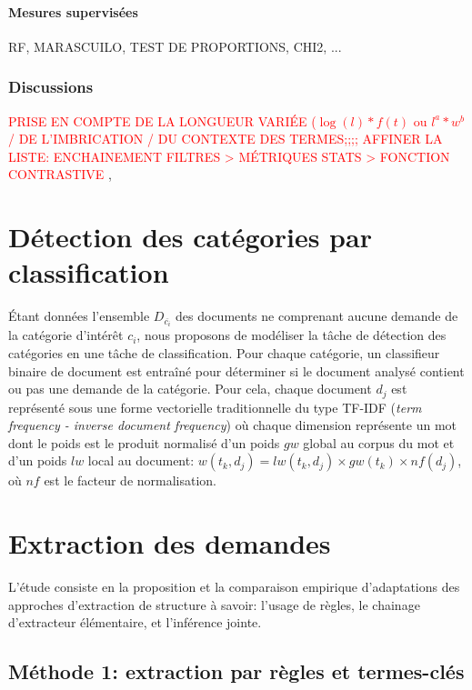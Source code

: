 \paragraph{Mesures supervisées}
RF, MARASCUILO, TEST DE PROPORTIONS, CHI2, ...



\subsubsection{Discussions}
\textcolor{red}{PRISE EN COMPTE DE LA LONGUEUR VARIÉE ($\log(l) * f(t)$ ou $l^a * w^b$ / DE L'IMBRICATION / DU CONTEXTE DES TERMES;;;; AFFINER LA LISTE: ENCHAINEMENT FILTRES > MÉTRIQUES STATS > FONCTION CONTRASTIVE}
\cite{LossioVentura2014biotex}, \cite{Bonin2010multiwordncvalue}


\section{Détection des catégories par classification}

Étant données l'ensemble $D_{\overline{c_i}}$ des documents ne comprenant aucune demande de la catégorie d'intérêt $c_i$, nous proposons de modéliser la tâche de détection des catégories en une tâche de classification. Pour chaque catégorie, un classifieur binaire de document est entraîné pour déterminer si le document analysé contient ou pas une demande de la catégorie. Pour cela, chaque document $d_j$ est représenté sous une forme vectorielle traditionnelle du type TF-IDF (\textit{term frequency - inverse document frequency}) où chaque dimension représente un mot dont le poids est le produit normalisé d'un poids $gw$ global au corpus du mot et d'un poids $lw$ local au document: $w(t_k, d_j) = lw(t_k, d_j) \times gw(t_k) \times nf(d_j)$, où $nf$ est le facteur de normalisation. 


\section{Extraction des demandes}
\label{sec:quanta:attributs}

L'étude consiste en la proposition et la comparaison empirique d'adaptations des approches d'extraction de structure à savoir: l'usage de règles, le chainage d'extracteur élémentaire, et l'inférence jointe.


\subsection{Méthode 1: extraction par règles et termes-clés}
\label{subsec:quanta:attributs:regles}

